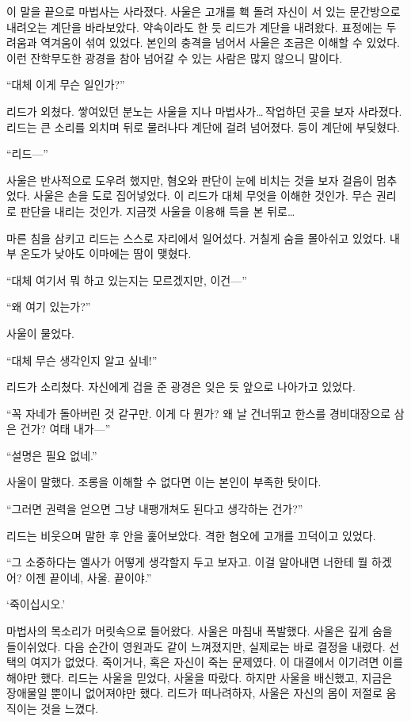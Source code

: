이 말을 끝으로 마법사는 사라졌다. 사울은 고개를 홱 돌려 자신이 서 있는 문간방으로 내려오는 계단을 바라보았다. 약속이라도 한 듯 리드가 계단을 내려왔다. 표정에는 두려움과 역겨움이 섞여 있었다. 본인의 충격을 넘어서 사울은 조금은 이해할 수 있었다. 이런 잔학무도한 광경을 참아 넘어갈 수 있는 사람은 많지 않으니 말이다.

``대체 이게 무슨 일인가?''

리드가 외쳤다. 쌓여있던 분노는 사울을 지나 마법사가\ldots\,작업하던 곳을 보자 사라졌다. 리드는 큰 소리를 외치며 뒤로 물러나다 계단에 걸려 넘어졌다. 등이 계단에 부딪혔다.

``리드—''

사울은 반사적으로 도우려 했지만, 혐오와 판단이 눈에 비치는 것을 보자 걸음이 멈추었다. 사울은 손을 도로 집어넣었다. 이 리드가 대체 무엇을 이해한 것인가. 무슨 권리로 판단을 내리는 것인가. 지금껏 사울을 이용해 득을 본 뒤로\ldots

마른 침을 삼키고 리드는 스스로 자리에서 일어섰다. 거칠게 숨을 몰아쉬고 있었다. 내부 온도가 낮아도 이마에는 땀이 맺혔다.

``대체 여기서 뭐 하고 있는지는 모르겠지만, 이건—''

``왜 여기 있는가?''

사울이 물었다.

``대체 무슨 생각인지 알고 싶네!''

리드가 소리쳤다. 자신에게 겁을 준 광경은 잊은 듯 앞으로 나아가고 있었다.

``꼭 자네가 돌아버린 것 같구만. 이게 다 뭔가? 왜 날 건너뛰고 한스를 경비대장으로 삼은 건가? 여태 내가—''

``설명은 필요 없네.''

사울이 말했다. 조롱을 이해할 수 없다면 이는 본인이 부족한 탓이다.

``그러면 권력을 얻으면 그냥 내팽개쳐도 된다고 생각하는 건가?''

리드는 비웃으며 말한 후 안을 훑어보았다. 격한 혐오에 고개를 끄덕이고 있었다.

``그 소중하다는 엘사가 어떻게 생각할지 두고 보자고. 이걸 알아내면 너한테 뭘 하겠어? 이젠 끝이네, 사울. 끝이야.''

`죽이십시오.'

마법사의 목소리가 머릿속으로 들어왔다. 사울은 마침내 폭발했다. 사울은 깊게 숨을 들이쉬었다. 다음 순간이 영원과도 같이 느껴졌지만, 실제로는 바로 결정을 내렸다. 선택의 여지가 없었다. 죽이거나, 혹은 자신이 죽는 문제였다. 이 대결에서 이기려면 이를 해야만 했다. 리드는 사울을 믿었다, 사울을 따랐다. 하지만 사울을 배신했고, 지금은 장애물일 뿐이니 없어져야만 했다. 리드가 떠나려하자, 사울은 자신의 몸이 저절로 움직이는 것을 느꼈다.

